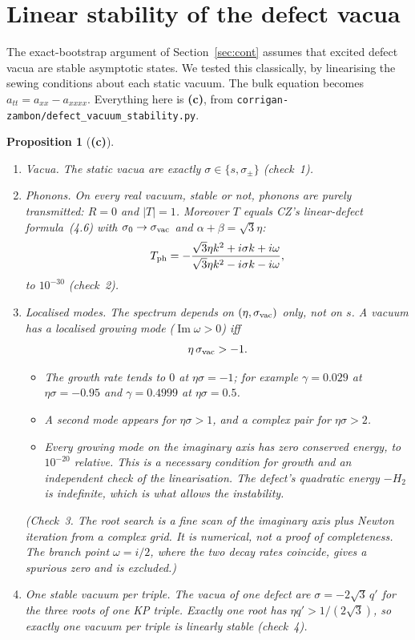 \documentclass[11pt,a4paper]{article}
\newcommand{\Lc}{\textsf{\textbf{(c)}}}\newcommand{\Ld}{\textsf{\textbf{(d)}}}
\newcommand{\script}[1]{\texttt{corrigan-zambon/#1}}
\newtheorem{proposition}{Proposition}\theoremstyle{remark}\newtheorem{remark}{Remark}
\begin{document}
\section{Linear stability of the defect vacua}\label{sec:stab}

The exact-bootstrap argument of Section~\ref{sec:cont} assumes that excited defect vacua are stable asymptotic states. We tested this classically, by linearising the sewing conditions about each static vacuum. The bulk equation becomes $a_{tt}=a_{xx}-a_{xxxx}$. Everything here is \Lc, from \script{defect\_vacuum\_stability.py}.

\begin{proposition}[\Lc]\label{prop:stab}
\begin{enumerate}
\item \emph{Vacua.} The static vacua are exactly $\sigma\in\{s,\sigma_\pm\}$ (check~1).
\item \emph{Phonons.} On every real vacuum, stable or not, phonons are purely transmitted: $R=0$ and $|T|=1$. Moreover $T$ equals CZ's linear-defect formula~(4.6) with $\sigma_0\to\sigma_{\rm vac}$ and $\alpha+\beta=\sqrt3\eta$:
\[
T_{\rm ph}=-\frac{\sqrt3\eta k^2+i\sigma k+i\omega}{\sqrt3\eta k^2-i\sigma k-i\omega},
\]
to $10^{-30}$ (check~2).
\item \emph{Localised modes.} The spectrum depends on $(\eta,\sigma_{\rm vac})$ only, not on $s$. A vacuum has a localised growing mode ($\operatorname{Im}\omega>0$) iff
\[
\eta\,\sigma_{\rm vac}>-1 .
\]
\begin{itemize}
\item The growth rate tends to $0$ at $\eta\sigma=-1$; for example $\gamma=0.029$ at $\eta\sigma=-0.95$ and $\gamma=0.4999$ at $\eta\sigma=0.5$.
\item A second mode appears for $\eta\sigma>1$, and a complex pair for $\eta\sigma>2$.
\item Every growing mode on the imaginary axis has zero conserved energy, to $10^{-20}$ relative. This is a necessary condition for growth and an independent check of the linearisation. The defect's quadratic energy $-H_2$ is indefinite, which is what allows the instability.
\end{itemize}
(Check~3. The root search is a fine scan of the imaginary axis plus Newton iteration from a complex grid. It is numerical, not a proof of completeness. The branch point $\omega=i/2$, where the two decay rates coincide, gives a spurious zero and is excluded.)
\item \emph{One stable vacuum per triple.} The vacua of one defect are $\sigma=-2\sqrt3\,q'$ for the three roots of one KP triple. Exactly one root has $\eta q'>1/(2\sqrt3)$, so \emph{exactly one vacuum per triple is linearly stable} (check~4).
\end{enumerate}
\end{proposition}
\end{document}
